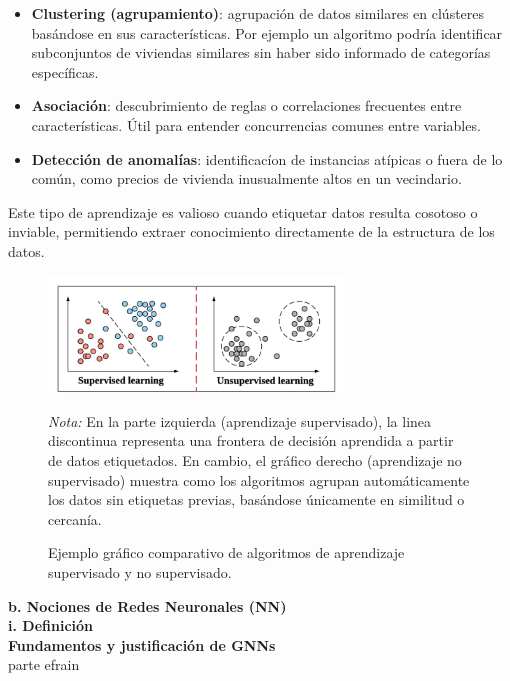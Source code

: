 \documentclass[11pt]{article} %
\begin{document}
\begin{itemize}
    \begin{itemize}
        \item \textbf{Clustering (agrupamiento)}: agrupación de datos similares en clústeres basándose en sus características. Por ejemplo un algoritmo podría identificar subconjuntos de viviendas similares sin haber sido informado de categorías específicas.
        \item\textbf{Asociación}: descubrimiento de reglas o correlaciones frecuentes entre características. Útil para entender concurrencias comunes entre variables.
        \item\textbf{Detección de anomalías}: identificacíon de instancias atípicas o fuera de lo común, como precios de vivienda inusualmente altos en un vecindario.
    \end{itemize}
    Este tipo de aprendizaje es valioso cuando etiquetar datos resulta cosotoso o inviable, permitiendo extraer conocimiento directamente de la estructura de los datos.
\end{itemize}
\begin{figure}[H]
\centering
\includegraphics[width=0.7\textwidth]{Images/Examples-of-Supervised-Learning-Linear-Regression-and-Unsupervised-Learning.png}
\caption{Ejemplo gráfico comparativo de algoritmos de aprendizaje supervisado y no supervisado.}
\label{fig:aprendizaje-supervisado-no-supervisado}
\vspace{2mm}
\small\textit{Nota:} En la parte izquierda (aprendizaje supervisado), la linea discontinua representa una frontera de decisión aprendida a partir de datos etiquetados. En cambio, el gráfico derecho (aprendizaje no supervisado) muestra como los algoritmos agrupan automáticamente los datos sin etiquetas previas, basándose únicamente en similitud o cercanía.
\end{figure}
\textbf{b. Nociones de Redes Neuronales (NN)} \\[5pt]

\textbf{i. Definición} \\[3pt]
\newpage
\thispagestyle{empty}
{\large \textbf{Fundamentos y justificación de GNNs}} \\[5pt]
parte efrain
\end{document}

